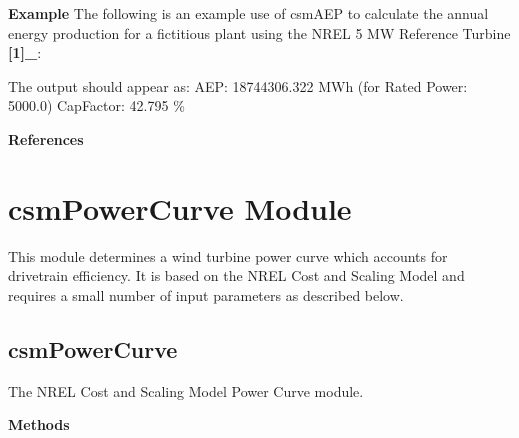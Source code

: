 \documentclass[letterpaper,10pt,openany,oneside]{sphinxmanual}
\begin{document}
\textbf{Example}
The following is an example use of csmAEP to calculate the annual energy production for a fictitious plant using the NREL 5 MW Reference Turbine {\color{red}\bfseries{}{[}1{]}\_}:

The output should appear as:
AEP:        18744306.322 MWh (for Rated Power: 5000.0)
CapFactor:      42.795 \%

\textbf{References}


\section{csmPowerCurve Module}
\label{documentation:csmpowercurve-module}\label{documentation:module-csm.src.csmPowerCurve}
This module determines a wind turbine power curve which accounts for drivetrain efficiency.  It is based on the NREL Cost and Scaling Model and requires a small number of input parameters as described below.


\subsection{csmPowerCurve}
\label{documentation:csmpowercurve}
The NREL Cost and Scaling Model Power Curve module.

\begin{fulllineitems}
\label{documentation:csm.src.csmPowerCurve.csmPowerCurve}
\end{fulllineitems}


\textbf{Methods}
\end{document}
